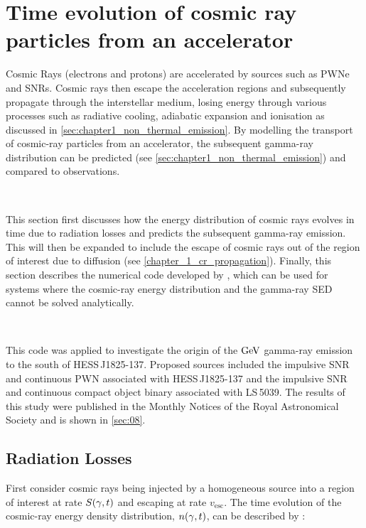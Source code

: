 \chapter[Time evolution of CR particles]{Time evolution of cosmic ray particles from an accelerator} \label{sec:07_particle_ev}

Cosmic Rays (electrons and protons) are accelerated by sources such as PWNe and SNRs. Cosmic rays then escape the acceleration regions and subsequently propagate through the interstellar medium, losing energy through various processes such as radiative cooling, adiabatic expansion and ionisation as discussed in \autoref{sec:chapter1_non_thermal_emission}. By modelling the transport of cosmic-ray particles from an accelerator, the subsequent gamma-ray distribution can be predicted (see \autoref{sec:chapter1_non_thermal_emission}) and compared to observations.
\par~\par
This section first discusses how the energy distribution of cosmic rays evolves in time due to radiation losses and predicts the subsequent gamma-ray emission. This will then be expanded to include the escape of cosmic rays out of the region of interest due to diffusion (see \autoref{chapter_1_cr_propagation}). Finally, this section describes the numerical code developed by \cite{fabien}, which can be used for systems where the cosmic-ray energy distribution and the gamma-ray SED cannot be solved analytically.
\par~\par
This code was applied to investigate the origin of the $\si{\giga\electronvolt}$ gamma-ray emission to the south of \mbox{HESS\,J1825-137}. Proposed sources included the impulsive SNR and continuous PWN associated with \mbox{HESS\,J1825-137} and the impulsive SNR and continuous compact object binary associated with \mbox{LS\,5039}. The results of this study were published in the Monthly Notices of the Royal Astronomical Society and is shown in \autoref{sec:08}.

\section{Radiation Losses} \label{sec:chapter_7_cr_SED_evol} 

First consider cosmic rays being injected by a homogeneous source into a region of interest at rate $S\qty(\gamma,t)$ and escaping at rate $v_\text{esc}$. The time evolution of the cosmic-ray energy density distribution, $n\qty(\gamma,t)$, can be described by \citep{1980gbs..bookR....M}:

